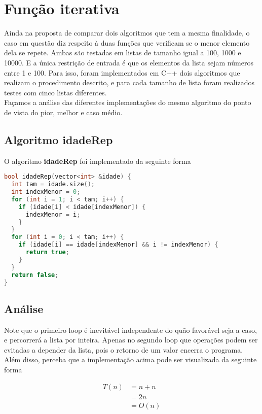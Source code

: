 \section{Função iterativa}
\label{sec:func-it}

Ainda na proposta de comparar dois algoritmos que tem a mesma finalidade, o caso em questão diz respeito à duas funções que verificam se o menor elemento dela se repete. Ambas são testadas em listas de tamanho igual a 100, 1000 e 10000. E a única restrição de entrada é que os elementos da lista sejam números entre 1 e 100. Para isso, foram implementados em C++ dois algoritmos que realizam o procedimento descrito, e para cada tamanho de lista foram realizados testes com cinco listas diferentes. \\
Façamos a análise das diferentes implementações do mesmo algoritmo do ponto de vista do pior, melhor e caso médio.

\subsection{Algoritmo idadeRep}

O algoritmo \textbf{idadeRep} foi implementado da seguinte forma

\begin{lstlisting}[language=C++]
bool idadeRep(vector<int> &idade) {
  int tam = idade.size();
  int indexMenor = 0;
  for (int i = 1; i < tam; i++) {
    if (idade[i] < idade[indexMenor]) {
      indexMenor = i;
    }
  }
  for (int i = 0; i < tam; i++) {
    if (idade[i] == idade[indexMenor] && i != indexMenor) {
      return true;
    }
  }
  return false;
}
\end{lstlisting}

\subsection{Análise}

Note que o primeiro loop é inevitável independente do quão favorável seja a caso, e percorrerá a lista por inteira. Apenas no segundo loop que operações podem ser evitadas a depender da lista, pois o retorno de um valor encerra o programa. Além disso, perceba que a implementação acima pode ser visualizada da seguinte forma

\begin{align*}
  T(n) & = n + n\\ 
       & = 2n \\
       & = O(n)
\end{align*}

